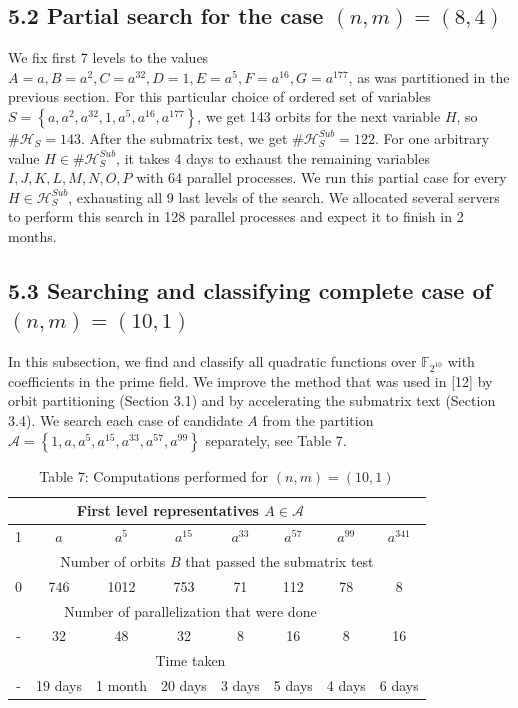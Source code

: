 \documentclass[10pt]{article}
\begin{document}
\subsection*{5.2 Partial search for the case $(n, m)=(8,4)$}
We fix first 7 levels to the values $A=a, B=a^{2}, C=a^{32}, D=1, E=a^{5}, F=a^{16}, G=a^{177}$, as was partitioned in the previous section. For this particular choice of ordered set of variables $S=\left\{a, a^{2}, a^{32}, 1, a^{5}, a^{16}, a^{177}\right\}$, we get 143 orbits for the next variable $H$, so $\# \mathcal{H}_{S}=143$. After the submatrix test, we get $\# \mathcal{H}_{S}^{S u b}=122$. For one arbitrary value $H \in \# \mathcal{H}_{S}^{S u b}$, it takes 4 days to exhaust the remaining variables $I, J, K, L, M, N, O, P$ with 64 parallel processes. We run this partial case for every $H \in \mathcal{H}_{S}^{S u b}$, exhausting all 9 last levels of the search. We allocated several servers to perform this search in 128 parallel processes and expect it to finish in 2 months.

\subsection*{5.3 Searching and classifying complete case of $(n, m)=(10,1)$}
In this subsection, we find and classify all quadratic functions over $\mathbb{F}_{2^{10}}$ with coefficients in the prime field. We improve the method that was used in [12] by orbit partitioning (Section 3.1) and by accelerating the submatrix text (Section 3.4). We search each case of candidate $A$ from the partition $\mathcal{A}=\left\{1, a, a^{5}, a^{15}, a^{33}, a^{57}, a^{99}\right\}$ separately, see Table 7.

\begin{table}[h]
\begin{center}
\begin{tabular}{|c|c|c|c|c|c|c|c|}
\hline
\multicolumn{7}{|c|}{First level representatives $A \in \mathcal{A}$} &  \\
\hline
1 & $a$ & $a^{5}$ & $a^{15}$ & $a^{33}$ & $a^{57}$ & $a^{99}$ & $a^{341}$ \\
\hline
\multicolumn{8}{|c|}{Number of orbits $B$ that passed the submatrix test} \\
\hline
0 & 746 & 1012 & 753 & 71 & 112 & 78 & 8 \\
\hline
\multicolumn{7}{|c|}{Number of parallelization that were done} &  \\
\hline
- & 32 & 48 & 32 & 8 & 16 & 8 & 16 \\
\hline
\multicolumn{7}{|c|}{Time taken} &  \\
\hline
- & 19 days & 1 month & 20 days & 3 days & 5 days & 4 days & 6 days \\
\hline
\end{tabular}
\captionsetup{labelformat=empty}
\caption{Table 7: Computations performed for $(n, m)=(10,1)$}
\end{center}
\end{table}
\end{document}
